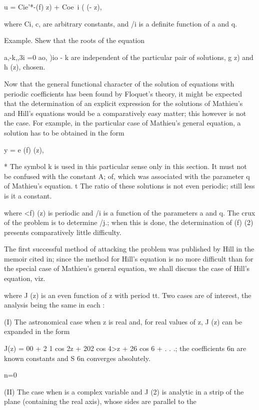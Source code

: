 u = Cie'*-(f) z) + Coe~i ( (- z),

where Ci, c, are arbitrary constants, and /i is a definite function of
a and q.

Example. Shew that the roots of the equation

a,-k,,3i =0 ao, )io - k are independent of the particular pair of
solutions, g z) and h (z), chosen.


Now that the general functional character of the solution of equations
with periodic coefficients has been found by Floquet's theory, it
might be expected that the determination of an explicit expression for
the solutions of Mathieu's and Hill's equations would be a
comparatively easy matter; this however is not the case. For example,
in the particular case of Mathieu's general equation, a solution has
to be obtained in the form

y = e (f) (z),

* The symbol k is used in this particular sense only in this section.
It must not be confused with the constant A; of, which was
associated with the parameter q of Mathieu's equation. t The ratio of
these solutions is not even periodic; still less is it a constant.

%
%

where <f) (z) is periodic and /i is a function of the parameters a and
q. The crux of the problem is to determine /j.; when this is done,
the determination of (f) (2) presents comparatively little difficulty.

The first successful method of attacking the problem was published by
Hill in the memoir cited in; since the method for Hill's
equation is no more difficult than for the special case of Mathieu's
general equation, we shall discuss the case of Hill's equation, viz.

where J (z) is an even function of z with period tt. Two cases are of
interest, the analysis being the same in each :

(I) The astronomical case when z is real and, for real values of z, J
(z) can be expanded in the form

J(z) = 00 + 2 1 cos 2z + 202 cos 4>z + 26 cos 6 + . . .; the
coefficients 6n are known constants and S 6n converges absolutely.

n=0

(II) The case when is a complex variable and J (2) is analytic in a
strip of the plane (containing the real axis), whose sides are
parallel to the

